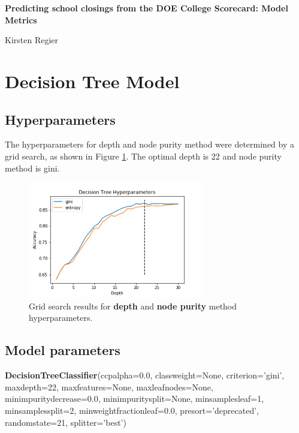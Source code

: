 \documentclass[11pt, letterpaper]{article}
\begin{document}
\begin{center}
\Large{\textbf{Predicting school closings from the DOE College Scorecard: \newline Model Metrics}}

\large{Kirsten Regier}
\end{center}

\section{Decision Tree Model}
\subsection{Hyperparameters}
The hyperparameters for depth and node purity method were determined by a grid search, as shown in Figure \ref{fig:DTHyper}. The optimal depth is 22 and node purity method is gini.

\begin{figure}[h]
\begin{center}
\includegraphics[width=3in]{DTHyperparameters.png}
\caption{Grid search results for \textbf{depth} and \textbf{node purity} method hyperparameters.} 
\label{fig:DTHyper}
\end{center}
\end{figure}

\subsection{Model parameters}
\noindent \textbf{DecisionTreeClassifier}(ccp\textunderscore alpha=0.0, class\textunderscore weight=None, criterion='gini', 
max\textunderscore depth=22, \newline 
max\textunderscore features=None, 
max\textunderscore leaf\textunderscore nodes=None, 
min\textunderscore impurity\textunderscore decrease=0.0, 
min\textunderscore impurity\textunderscore split=None, 
min\textunderscore samples\textunderscore leaf=1, 
min\textunderscore samples\textunderscore split=2, 
min\textunderscore weight\textunderscore fraction\textunderscore leaf=0.0, presort='deprecated', random\textunderscore state=21, splitter='best')
\end{document}
